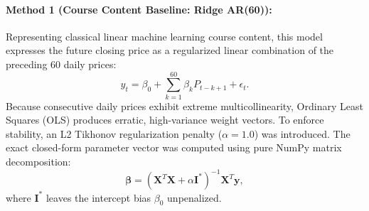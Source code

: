 \documentclass[11pt,letterpaper]{article}
\begin{document}
\paragraph{Method 1 (Course Content Baseline: Ridge AR(60)):}
Representing classical linear machine learning course content, this model expresses the future closing price as a regularized linear combination of the preceding 60 daily prices:
\begin{equation}
    y_t = \beta_0 + \sum_{k=1}^{60} \beta_k P_{t-k+1} + \epsilon_t.
\end{equation}
Because consecutive daily prices exhibit extreme multicollinearity, Ordinary Least Squares (OLS) produces erratic, high-variance weight vectors. To enforce stability, an L2 Tikhonov regularization penalty ($\alpha = 1.0$) was introduced. The exact closed-form parameter vector was computed using pure NumPy matrix decomposition:
\begin{equation}
    \boldsymbol{\beta} = (\mathbf{X}^T \mathbf{X} + \alpha \mathbf{I}^*)^{-1} \mathbf{X}^T \mathbf{y},
\end{equation}
where $\mathbf{I}^*$ leaves the intercept bias $\beta_0$ unpenalized.
\end{document}
